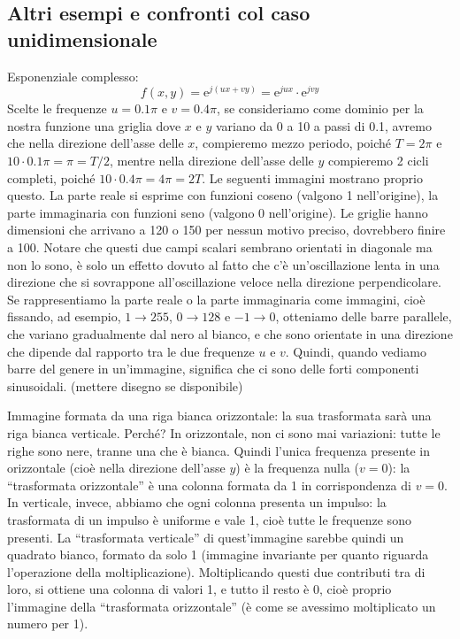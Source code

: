 \documentclass[a4paper,11pt]{article}
\begin{document}
\subsection{Altri esempi e confronti col caso unidimensionale}
Esponenziale complesso:
\[
f(x,y) = \mathrm{e}^{j(ux+vy)} = \mathrm{e}^{jux}\cdot \mathrm{e}^{jvy}
\]
Scelte le frequenze $u = 0.1\pi$ e $v = 0.4\pi$, se consideriamo come dominio per la nostra funzione una griglia dove $x$ e $y$ variano
da 0 a 10 a passi di 0.1, avremo che nella direzione dell'asse delle $x$, compieremo mezzo periodo, poiché $T=2\pi$ e $10 \cdot 0.1\pi = \pi = T/2$,
mentre nella direzione dell'asse delle $y$ compieremo 2 cicli completi, poiché $10 \cdot 0.4\pi = 4\pi = 2T$.
Le seguenti immagini mostrano proprio questo. La parte reale si esprime con funzioni coseno (valgono 1 nell'origine), la parte immaginaria
con funzioni seno (valgono 0 nell'origine). Le griglie hanno dimensioni che arrivano a 120 o 150 per nessun motivo preciso, dovrebbero finire a 100.
Notare che questi due campi scalari sembrano orientati in diagonale ma non lo sono, è solo un effetto dovuto al fatto che c'è un'oscillazione lenta
in una direzione che si sovrappone all'oscillazione veloce nella direzione perpendicolare.
Se rappresentiamo la parte reale o la parte immaginaria come immagini, cioè fissando, ad esempio, $1 \rightarrow 255$, $0 \rightarrow 128$
e $-1 \rightarrow 0$, otteniamo
delle barre parallele, che variano gradualmente dal nero al bianco, e che sono orientate in una direzione che dipende dal rapporto tra le due
frequenze $u$ e $v$. Quindi, quando vediamo barre del genere in un'immagine, significa che ci sono delle forti componenti sinusoidali.
(mettere disegno se disponibile)
\par
Immagine formata da una riga bianca orizzontale: la sua trasformata sarà una riga bianca verticale. Perché? In orizzontale, non ci sono mai variazioni:
tutte le righe sono nere, tranne una che è bianca. Quindi l'unica frequenza presente in orizzontale (cioè nella direzione dell'asse $y$)
è la frequenza nulla ($v=0$): la ``trasformata orizzontale'' è una colonna formata da 1 in corrispondenza di $v=0$.
In verticale, invece, abbiamo che ogni colonna presenta un impulso: la trasformata di un impulso è uniforme e vale 1, cioè
tutte le frequenze sono presenti. La ``trasformata verticale'' di quest'immagine sarebbe quindi un quadrato bianco, formato da solo 1 (immagine invariante
per quanto riguarda l'operazione della moltiplicazione).
Moltiplicando questi due contributi tra di loro, si ottiene una colonna di valori 1, e tutto il resto è 0, cioè proprio l'immagine della
``trasformata orizzontale'' (è come se avessimo moltiplicato un numero per 1).
\end{document}

